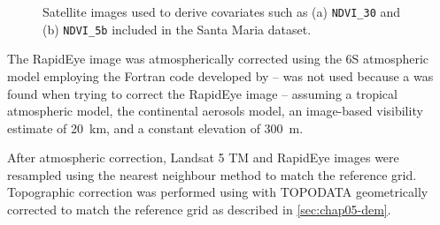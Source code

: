 \begin{figure}[!ht]
\begin{minipage}[b]{0.45\textwidth}
\end{minipage} 
\caption[Satellite images included in the Santa Maria dataset.]{Satellite images used to derive covariates such 
as (a) \texttt{NDVI\_30} and (b) \texttt{NDVI\_5b} included in the Santa Maria dataset.}
\label{fig:chap05-sat-image}
\end{figure}


The RapidEye image was atmospherically corrected using the 6S atmospheric model \cite{VermoteEtAl1997} 
employing the Fortran code developed by  --  was not used because a 
\atcorrbug{} was found when trying to correct the RapidEye image -- assuming a tropical atmospheric model, the 
continental aerosols model, an image-based 
visibility estimate of \SI{20}{\km}, and a constant elevation of \SI{300}{\m}.

After atmospheric correction, Landsat 5 TM and RapidEye images were resampled using the nearest neighbour 
method to match the reference grid. Topographic correction was performed using  with 
TOPODATA geometrically corrected to match the reference grid as described in \autoref{sec:chap05-dem}.

